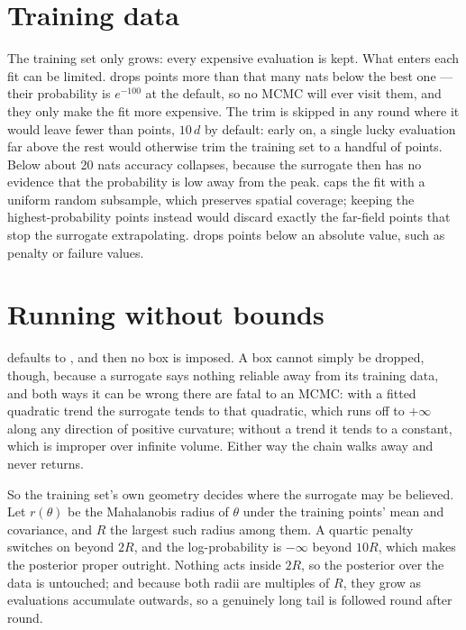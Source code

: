 \section{Training data}

The training set only grows: every expensive evaluation is kept. What enters each fit can be
limited.  drops points more than that many nats below the best
one --- their probability is $e^{-100}$ at the default, so no MCMC will ever visit them, and they only
make the fit more expensive. The trim is skipped in any round where it would leave fewer than
 points, $10\,d$ by default: early on, a single lucky evaluation far
above the rest would otherwise trim the training set to a handful of points.
Below about 20 nats accuracy collapses, because the surrogate then has no evidence that the
probability is low away from the peak.  caps the fit with a uniform random
subsample, which preserves spatial coverage; keeping the highest-probability points instead would
discard exactly the far-field points that stop the surrogate extrapolating. 
drops points below an absolute value, such as penalty or failure values.

\section{Running without bounds}
\label{sec:unbounded}

 defaults to , and then no box is imposed. A box cannot simply be
dropped, though, because a surrogate says nothing reliable away from its training data, and both ways
it can be wrong there are fatal to an MCMC: with a fitted quadratic trend the surrogate tends to that
quadratic, which runs off to $+\infty$ along any direction of positive curvature; without a trend it
tends to a constant, which is improper over infinite volume. Either way the chain walks away and
never returns.

So the training set's own geometry decides where the surrogate may be believed. Let $r(\theta)$ be
the Mahalanobis radius of $\theta$ under the training points' mean and covariance, and $R$ the largest
such radius among them. A quartic penalty switches on beyond $2R$, and the log-probability is
$-\infty$ beyond $10R$, which makes the posterior proper outright. Nothing acts inside $2R$, so the
posterior over the data is untouched; and because both radii are multiples of $R$, they grow as
evaluations accumulate outwards, so a genuinely long tail is followed round after round.

